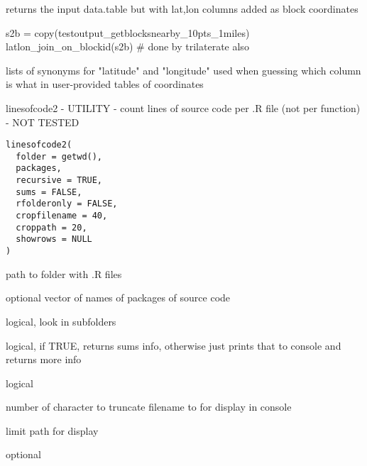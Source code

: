 \documentclass[a4paper]{book}
\begin{document}
%
\begin{Value}
returns the input data.table but with lat,lon columns added as block coordinates
\end{Value}
%
\begin{Examples}
\begin{ExampleCode}
 s2b = copy(testoutput_getblocksnearby_10pts_1miles)
 latlon_join_on_blockid(s2b) # done by trilaterate also
 
\end{ExampleCode}
\end{Examples}
%
\begin{Description}\relax
lists of synonyms for "latitude" and "longitude" used when guessing which column is what in user-provided tables of coordinates
\end{Description}
%
\begin{Description}\relax
linesofcode2 - UTILITY - count lines of source code per .R file (not per function) - NOT TESTED
\end{Description}
%
\begin{Usage}
\begin{verbatim}
linesofcode2(
  folder = getwd(),
  packages,
  recursive = TRUE,
  sums = FALSE,
  rfolderonly = FALSE,
  cropfilename = 40,
  croppath = 20,
  showrows = NULL
)
\end{verbatim}
\end{Usage}
%
\begin{Arguments}
\begin{ldescription}
\item[\code{folder}] path to folder with .R files

\item[\code{packages}] optional vector of names of packages of source code

\item[\code{recursive}] logical, look in subfolders

\item[\code{sums}] logical, if TRUE, returns sums info, otherwise just prints that to console and returns more info

\item[\code{rfolderonly}] logical

\item[\code{cropfilename}] number of character to truncate filename to for display in console

\item[\code{croppath}] limit path for display

\item[\code{showrows}] optional
\end{ldescription}
\end{Arguments}
\end{document}
